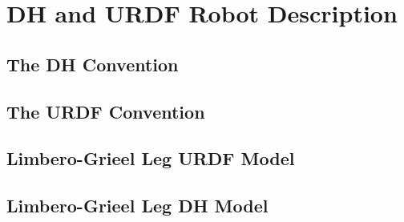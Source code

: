 \chapter{DH and URDF Robot Description}
\label{ch:appendixA}%

\section{The DH Convention}
\label{sec:DH}

\section{The URDF Convention}
\label{sec:URDF}

\section{Limbero-Grieel Leg URDF Model}
\label{sec:Limbero_URDF}

\section{Limbero-Grieel Leg DH Model}
\label{sec:Limbero_DH}
